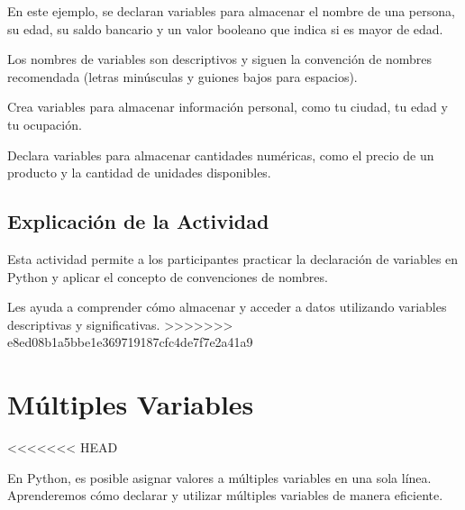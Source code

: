 \documentclass[
  a4paper,
  DIV=11,
  numbers=noendperiod,
  onepage,
  openany]{scrreprt}
\begin{document}
En este ejemplo, se declaran variables para almacenar el nombre de una
persona, su edad, su saldo bancario y un valor booleano que indica si es
mayor de edad.

Los nombres de variables son descriptivos y siguen la convención de
nombres recomendada (letras minúsculas y guiones bajos para espacios).

\begin{tcolorbox}[enhanced jigsaw, colbacktitle=quarto-callout-important-color!10!white, toprule=.15mm, leftrule=.75mm, titlerule=0mm, opacityback=0, rightrule=.15mm, opacitybacktitle=0.6, breakable, left=2mm, coltitle=black, title=\textcolor{quarto-callout-important-color}{\faExclamation}\hspace{0.5em}{Actividad Práctica}, toptitle=1mm, bottomtitle=1mm, arc=.35mm, bottomrule=.15mm, colback=white, colframe=quarto-callout-important-color-frame]

Crea variables para almacenar información personal, como tu ciudad, tu
edad y tu ocupación.

Declara variables para almacenar cantidades numéricas, como el precio de
un producto y la cantidad de unidades disponibles.

\end{tcolorbox}

\hypertarget{explicaciuxf3n-de-la-actividad-9}{%
\section{Explicación de la
Actividad}\label{explicaciuxf3n-de-la-actividad-9}}

Esta actividad permite a los participantes practicar la declaración de
variables en Python y aplicar el concepto de convenciones de nombres.

Les ayuda a comprender cómo almacenar y acceder a datos utilizando
variables descriptivas y significativas.
\textgreater\textgreater\textgreater\textgreater\textgreater\textgreater\textgreater{}
e8ed08b1a5bbe1e369719187cfc4de7f7e2a41a9

\hypertarget{muxfaltiples-variables}{%
\chapter{Múltiples Variables}\label{muxfaltiples-variables}}

\textless\textless\textless\textless\textless\textless\textless{} HEAD

En Python, es posible asignar valores a múltiples variables en una sola
línea. Aprenderemos cómo declarar y utilizar múltiples variables de
manera eficiente.
\end{document}
